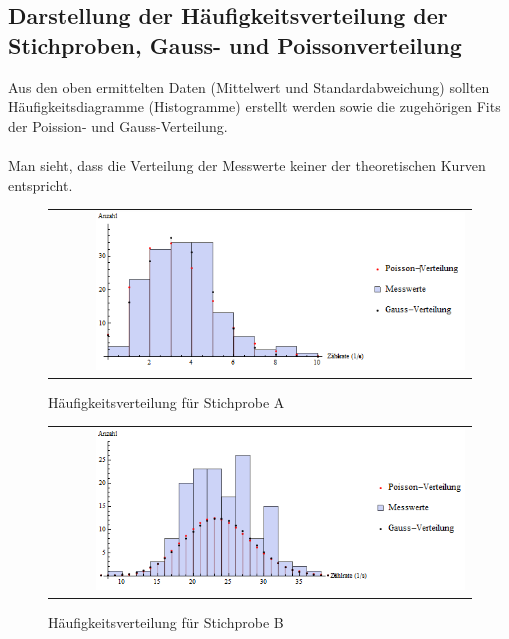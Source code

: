 \documentclass[a4paper,titlepage]{scrartcl}
\numberwithin{equation}{section}
\begin{document}
\subsection{Darstellung der Häufigkeitsverteilung der Stichproben, Gauss- und Poissonverteilung}
Aus den oben ermittelten Daten (Mittelwert und Standardabweichung) sollten Häufigkeitsdiagramme (Histogramme) erstellt werden sowie die zugehörigen Fits der Poission- und Gauss-Verteilung.\\ \\
Man sieht, dass die Verteilung der Messwerte keiner der theoretischen Kurven entspricht.
\begin{figure}[H]
		\centering
		\begin{tabular}{@{}r@{}}
			\includegraphics[width=0.9\textwidth]{bilder/Aufgabe4/probea.png}\\
		\end{tabular}
		\caption{Häufigkeitsverteilung für Stichprobe A}
		\label{fig:aufgabe4probaA}
\end{figure}
\begin{figure}[H]
		\centering
		\begin{tabular}{@{}r@{}}
			\includegraphics[width=0.9\textwidth]{bilder/aufgabe4/probeb.png}\\
		\end{tabular}
		\caption{Häufigkeitsverteilung für Stichprobe B}
		\label{fig:aufgabe4probaB}
\end{figure}
\end{document}
